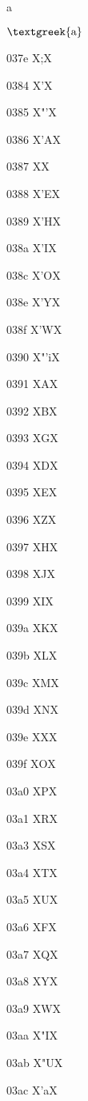 \documentclass[11pt]{article}
\begin{document}
\textgreek{a}

$\mbox{\textgreek{a}}$

037e X{;}X

0384 X{\textgreek{'}}X

0385 X{\textgreek{"'}}X

0386 X{\textgreek{'A}}X

0387 X{\textperiodcentered}X

0388 X{\textgreek{'E}}X

0389 X{\textgreek{'H}}X

038a X{\textgreek{'I}}X

038c X{\textgreek{'O}}X

038e X{\textgreek{'Y}}X

038f X{\textgreek{'W}}X

0390 X{\textgreek{"'i}}X

0391 X{\textgreek{A}}X

0392 X{\textgreek{B}}X

0393 X{\textgreek{G}}X

0394 X{\textgreek{D}}X

0395 X{\textgreek{E}}X

0396 X{\textgreek{Z}}X

0397 X{\textgreek{H}}X

0398 X{\textgreek{J}}X

0399 X{\textgreek{I}}X

039a X{\textgreek{K}}X

039b X{\textgreek{L}}X

039c X{\textgreek{M}}X

039d X{\textgreek{N}}X

039e X{\textgreek{X}}X

039f X{\textgreek{O}}X

03a0 X{\textgreek{P}}X

03a1 X{\textgreek{R}}X

03a3 X{\textgreek{S}}X

03a4 X{\textgreek{T}}X

03a5 X{\textgreek{U}}X

03a6 X{\textgreek{F}}X

03a7 X{\textgreek{Q}}X

03a8 X{\textgreek{Y}}X

03a9 X{\textgreek{W}}X

03aa X{\textgreek{"I}}X

03ab X{\textgreek{"U}}X

03ac X{\textgreek{'a}}X
\end{document}

